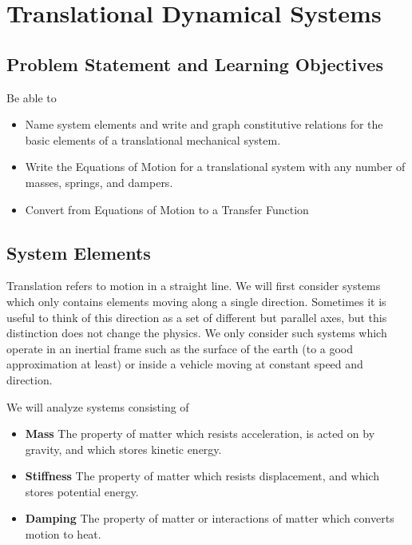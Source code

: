 %
%
%

\chapter{Translational Dynamical Systems}

\section{Problem Statement and Learning Objectives}
Be able to
\begin{itemize}
  \item Name system elements and write and graph constitutive relations for the basic elements
  of a translational mechanical system.
  \item Write the Equations of Motion for a translational system with any number of masses, springs, and dampers.
  \item Convert from Equations of Motion to a Transfer Function
\end{itemize}

\section{System Elements}

Translation refers to motion in a straight line.   We will first consider systems which only contains elements moving along a single direction.  Sometimes it is useful to think of this direction as a set of different but parallel axes, but this distinction does not change the physics. We only consider such systems which operate in an inertial frame such as the surface of the earth (to a good approximation at least) or inside
a vehicle moving at constant speed and direction.


We will analyze systems consisting of
\begin{itemize}
  \item {\bf Mass}        The property of matter which resists acceleration, is acted on by gravity, and which stores kinetic energy.
  \item {\bf Stiffness}   The property of matter which resists displacement, and which stores potential energy.
  \item {\bf Damping}     The property of matter or interactions of matter which converts motion to heat.
\end{itemize}

